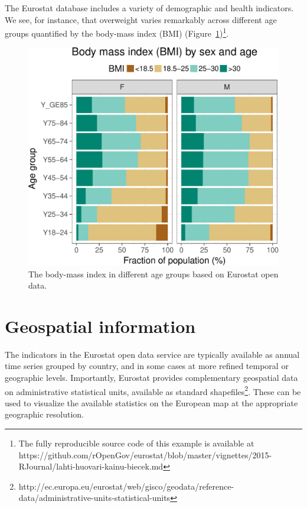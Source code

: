 The Eurostat database includes a variety of demographic and health
indicators. We see, for instance, that overweight varies remarkably
across different age groups quantified by the body-mass index (BMI)
(Figure~\ref{fig:bmi})\footnote{The fully reproducible source code
of this example is available at
https://github.com/rOpenGov/eurostat/blob/master/vignettes/2015-RJournal/lahti-huovari-kainu-biecek.md}.


\begin{figure}
\begin{center}
\includegraphics{2015-manu-bmi-1}
\end{center}
\caption{The body-mass index in different age groups based on Eurostat open data.}
\label{fig:bmi}
\end{figure}



\section{Geospatial information}

The indicators in the Eurostat open data service are typically
available as annual time series grouped by country, and in some cases
at more refined temporal or geographic levels. Importantly, Eurostat
provides complementary geospatial data on administrative statistical
units, available as standard
shapefiles\footnote{http://ec.europa.eu/eurostat/web/gisco/geodata/reference-data/administrative-units-statistical-units}. These
can be used to visualize the available statistics on the European map
at the appropriate geographic resolution.

